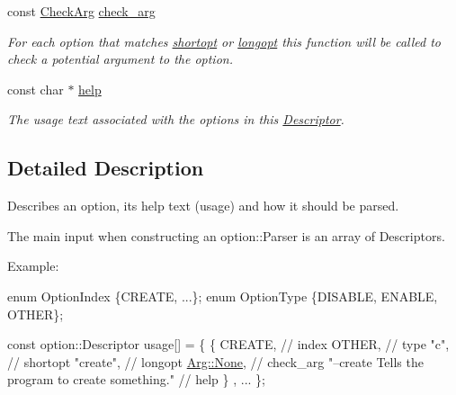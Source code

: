 \begin{DoxyCompactItemize}
const \hyperlink{namespace_option_parser_aee9955553cc70fd9fd41849622680c6a}{Check\-Arg} \hyperlink{struct_option_parser_1_1_descriptor_aac19c7bd3a84282211edd0331c92a44a}{check\-\_\-arg}
\begin{DoxyCompactList}\small\item\em For each option that matches \hyperlink{struct_option_parser_1_1_descriptor_a21415d74531b006e9a7a06ccadbd2721}{shortopt} or \hyperlink{struct_option_parser_1_1_descriptor_ab9db8207bae68dd5c4ee83e05189a9d0}{longopt} this function will be called to check a potential argument to the option. \end{DoxyCompactList}\item 
const char $\ast$ \hyperlink{struct_option_parser_1_1_descriptor_ad281343957d1b5c1d617306479788f13}{help}
\begin{DoxyCompactList}\small\item\em The usage text associated with the options in this \hyperlink{struct_option_parser_1_1_descriptor}{Descriptor}. \end{DoxyCompactList}\end{DoxyCompactItemize}


\subsection{Detailed Description}
Describes an option, its help text (usage) and how it should be parsed. 

The main input when constructing an option\-::\-Parser is an array of Descriptors.

\begin{DoxyParagraph}{Example\-:}

\begin{DoxyCode}
\textcolor{keyword}{enum} OptionIndex \{CREATE, ...\};
\textcolor{keyword}{enum} OptionType \{DISABLE, ENABLE, OTHER\};

\textcolor{keyword}{const} option::Descriptor usage[] = \{
  \{ CREATE,                                            \textcolor{comment}{// index}
    OTHER,                                             \textcolor{comment}{// type}
    \textcolor{stringliteral}{"c"},                                               \textcolor{comment}{// shortopt}
    \textcolor{stringliteral}{"create"},                                          \textcolor{comment}{// longopt}
    \hyperlink{struct_option_parser_1_1_arg_afd9e5e7362e4accc619fe7dee7098956}{Arg::None},                                         \textcolor{comment}{// check\_arg}
    \textcolor{stringliteral}{"--create  Tells the program to create something."} \textcolor{comment}{// help}
  \}
  , ...
\};
\end{DoxyCode}
 
\end{DoxyParagraph}


